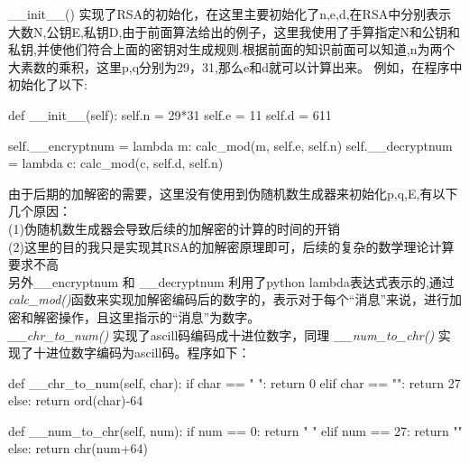 \documentclass[UTF8,nofonts,cs4size]{ctexrep}
\begin{document}
\_\_init\_\_() 实现了RSA的初始化，在这里主要初始化了n,e,d,在RSA中分别表示大数N,公钥E,私钥D,由于前面算法给出的例子，这里我使用了手算指定N和公钥和私钥,并使他们符合上面的密钥对生成规则.根据前面的知识前面可以知道,n为两个大素数的乘积，这里p,q分别为29，31,那么e和d就可以计算出来。
例如，在程序中初始化了以下:
\begin{python}
def __init__(self):
        self.n = 29*31 
        self.e = 11
        self.d = 611

        self.__encryptnum = lambda m: calc_mod(m, self.e, self.n)
        self.__decryptnum = lambda c: calc_mod(c, self.d, self.n)
\end{python}

\indent 由于后期的加解密的需要，这里没有使用到伪随机数生成器来初始化p,q,E,有以下几个原因：\\
\indent (1)伪随机数生成器会导致后续的加解密的计算的时间的开销 \\
\indent (2)这里的目的我只是实现其RSA的加解密原理即可，后续的复杂的数学理论计算要求不高\\
\indent 另外\_\_encryptnum 和 \_\_decryptnum 利用了python lambda表达式表示的,通过\textit{calc\_mod()}函数来实现加解密编码后的数字的，表示对于每个“消息”来说，进行加密和解密操作，且这里指示的“消息”为数字。\\
\indent \textit{\_\_chr\_to\_num()} 实现了ascill码编码成十进位数字，同理 \textit{\_\_num\_to\_chr()} 实现了十进位数字编码为ascill码。程序如下：

\begin{python}
def __chr_to_num(self, char):
        if char == " ":
            return 0
        elif char == "\0":
            return 27
        else:
            return ord(char)-64

    def __num_to_chr(self, num):
        if num == 0:
            return " "
        elif num == 27:
            return "\0"
        else:
            return chr(num+64)
\end{python}
\end{document}
